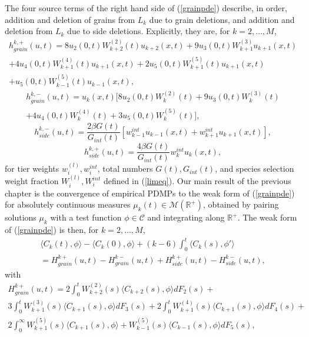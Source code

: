 The four source terms of the right hand side of (\ref{grainpde}) describe, in order, addition and deletion of grains from $L_k$ due to grain deletions, and addition and deletion from $L_k$ due to side deletions.
Explicitly, they are, for $k = 2, \dots, M$,
\begin{eqnarray}
h_{grain}^{k,+}(u,t)= 8u_2(0,t)W_{k+2}^{(2)}(t)u_{k+2}(x,t)+9u_{3}(0,t)W_{k+1}^{(3)}u_{k+1}(x,t)\\+4u_{4}(0,t)W_{k+1}^{(4)}(t)u_{k+1}(x,t)+ 2u_{5}(0,t)W_{k+1}^{(5)}(t)u_{k+1}(x,t)\nonumber\\+u_{5}(0,t)W_{k-1}^{(5)}(t)u_{k-1}(x,t), \nonumber
\end{eqnarray}
\begin{eqnarray}
h_{grain}^{k,-}(u,t) = u_k(x,t)[8u_2(0,t)W_{k}^{(2)}(t)+9u_{3}(0,t)W_{k}^{(3)}(t)\\+4u_{4}(0,t)W_{k}^{(4)}(t)+3u_{5}(0,t)W_{k}^{(5)}(t)],
\nonumber
\end{eqnarray} 
\begin{equation}
h_{side}^{k,-}(u,t)= \frac{2\beta G(t)}{G_{int}(t)}[w_{k-1}^{int}u_{k-1}(x,t)+w_{k+1}^{int}u_{k+1}(x,t)],
\end{equation}
\begin{equation}
h_{side}^{k,+}(u,t)= \frac{4\beta G(t)}{G_{int}(t)}w_k^{int}u_k(x,t),
\end{equation}
for tier weights $w_i^{(l)},w_i^{int}$, total numbers $G(t),G_{int}(t)$, and species selection weight fraction $W_i^{(l)},W_i^{int}$ defined in (\ref{limeq}).
Our main result of the previous chapter is the convergence of empirical PDMPs to the weak form of (\ref{grainpde}) for absolutely continuous measures $\mu_k(t) \in \mathcal{M}(\mathbb{R}^+)$, obtained by pairing solutions $\mu_k$ with a test function $\phi \in \mathcal C$ and integrating along $\mathbb{R}^+$. The weak form of (\ref{grainpde}) is then, for  $k = 2, \dots, M$, 
 \begin{eqnarray}\label{weakgrainpde}
\langle C_k(t), \phi\rangle -  \langle C_k(0), \phi\rangle+(k-6)\int_0^t \langle C_k(s), \phi' \rangle\\= H^{k+}_{grain}(u,t)-H_{grain}^{k-}(u,t)+H^{k+}_{side}(u,t)-H_{side}^{k-}(u,t) ,\nonumber
\end{eqnarray} 
with
\begin{eqnarray}
H^{k+}_{grain}(u,t)=2\int_0^tW^{(2)}_{k+2}(s)\langle C_{k+2}(s), \phi \rangle dF_{2}(s)+\\3\int_0^tW^{(3)}_{k+1}(s)\langle C_{k+1}(s), \phi \rangle dF_{3}(s)+2\int_0^tW^{(4)}_{k+1}(s)\langle C_{k+1}(s), \phi \rangle dF_{4}(s)+ \\2\int_0^\infty W^{(5)}_{k+1}(s)\langle C_{k+1}(s), \phi \rangle+W^{(5)}_{k-1}(s)\langle C_{k-1}(s), \phi \rangle dF_5(s), \nonumber
\end{eqnarray}
